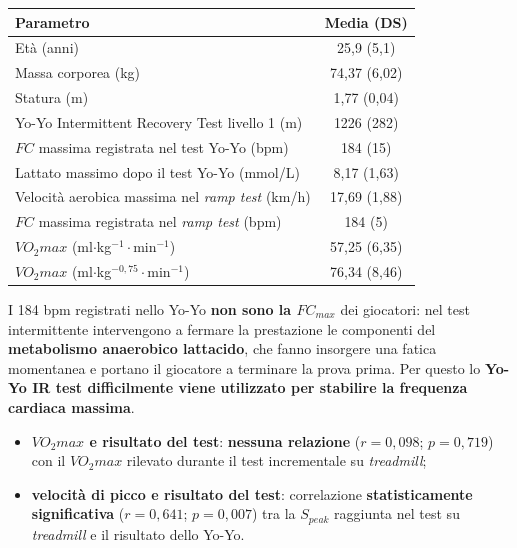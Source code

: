 \begin{table}[htbp]
  \centering
  \small
  \renewcommand{\arraystretch}{1.3}
  \begin{tabularx}{\textwidth}{|X|c|}
    \hline
    \textbf{Parametro} & \textbf{Media (DS)} \\
    \hline
    Età (anni) & 25,9 (5,1) \\
    \hline
    Massa corporea (kg) & 74,37 (6,02) \\
    \hline
    Statura (m) & 1,77 (0,04) \\
    \hline
    Yo-Yo Intermittent Recovery Test livello 1 (m) & 1226 (282) \\
    \hline
    $FC$ massima registrata nel test Yo-Yo (bpm) & 184 (15) \\
    \hline
    Lattato massimo dopo il test Yo-Yo (mmol/L) & 8,17 (1,63) \\
    \hline
    Velocità aerobica massima nel \textit{ramp test} (km/h) & 17,69 (1,88) \\
    \hline
    $FC$ massima registrata nel \textit{ramp test} (bpm) & 184 (5) \\
    \hline
    $VO_2max$ (ml$\cdot$kg$^{-1}\cdot$min$^{-1}$) & 57,25 (6,35) \\
    \hline
    $VO_2max$ (ml$\cdot$kg$^{-0,75}\cdot$min$^{-1}$) & 76,34 (8,46) \\
    \hline
  \end{tabularx}
\end{table}

I 184 bpm registrati nello Yo-Yo \textbf{non sono la $FC_{max}$} dei giocatori: nel test
intermittente intervengono a fermare la prestazione le componenti del \textbf{metabolismo
anaerobico lattacido}, che fanno insorgere una fatica momentanea e portano il giocatore a
terminare la prova prima. Per questo lo \textbf{Yo-Yo IR test difficilmente viene utilizzato per
stabilire la frequenza cardiaca massima}.

\begin{itemize}
  \item \textbf{$VO_2max$ e risultato del test}: \textbf{nessuna relazione} ($r = 0,098$;
    $p = 0,719$) con il $VO_2max$ rilevato durante il test incrementale su \textit{treadmill};
  \item \textbf{velocità di picco e risultato del test}: correlazione \textbf{statisticamente
    significativa} ($r = 0,641$; $p = 0,007$) tra la \textbf{$S_{peak}$} raggiunta nel test su
    \textit{treadmill} e il risultato dello Yo-Yo.
\end{itemize}

